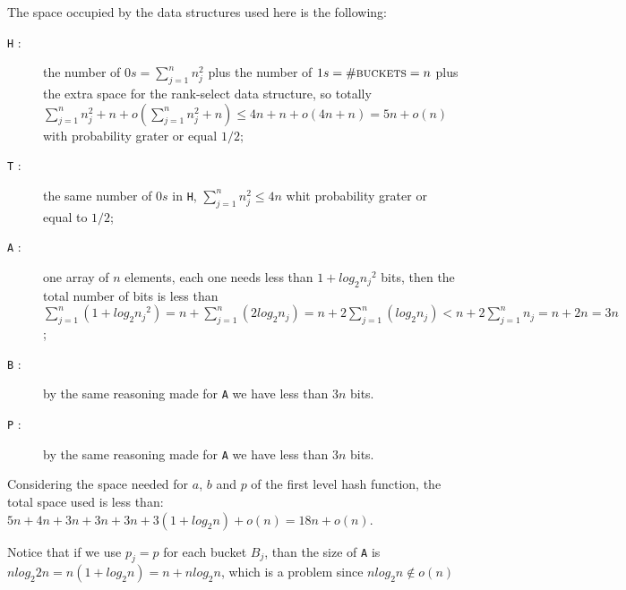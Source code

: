\documentclass[a4paper]{article}
\begin{document}
\noindent
The space occupied by the data structures used here is the following:
\begin{description}
\item [\texttt{H} :] the number of $0s=\sum_{j=1}^{n}n_j^2$ plus the number of $1s=\#\textsc{buckets}=n$ plus the extra space for the rank-select data structure, so totally $\sum_{j=1}^{n}n_j^2 + n + o(\sum_{j=1}^{n}n_j^2 + n) \leq 4n + n + o(4n + n) = 5n + o(n)$ with probability grater or equal $1/2$;
\item [\texttt{T} :] the same number of $0s$ in \texttt{H}, $\sum_{j=1}^{n}n_j^2 \leq 4n$ whit probability grater or equal to $1/2$;
\item [\texttt{A} :] one array of $n$ elements, each one needs less than $1 + log_2 {n_j}^2$ bits, then the total number of bits is less than $\sum_{j=1}^{n}(1 + log_2 {n_j}^2) = n + \sum_{j=1}^{n}(2 log_2 n_j) = n + 2 \sum_{j=1}^{n}(log_2 {n_j}) < n + 2 \sum_{j=1}^{n}n_j = n + 2n = 3n$;
\item [\texttt{B} :] by the same reasoning made for \texttt{A} we have less than $3n$ bits.
\item [\texttt{P} :] by the same reasoning made for \texttt{A} we have less than $3n$ bits.
\end{description}
Considering the space needed for $a$, $b$ and $p$ of the first level hash function, the total space used is less than:
$5n + 4n + 3n + 3n + 3n + 3(1 + log_2 n) + o(n) = 18n + o(n)$.

Notice that if we use $p_j = p$ for each bucket $B_j$, than the size of \texttt{A} is $n log_2 2n = n(1 + log_2 n) = n + n log_2 n$, which is a problem since $nlog_2 n\not\in o(n)$  
\end{document}
